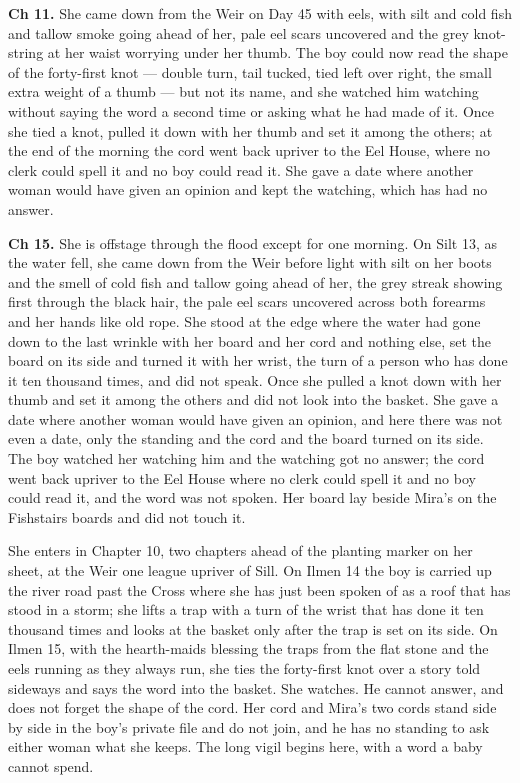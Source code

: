 \documentclass{design/chronicle}
\begin{document}
{\textbf{Ch 11.} She came down from the Weir on Day 45 with eels, with silt and cold fish and tallow smoke going ahead of her, pale eel scars uncovered and the grey knot-string at her waist worrying under her thumb. The boy could now read the shape of the forty-first knot --- double turn, tail tucked, tied left over right, the small extra weight of a thumb --- but not its name, and she watched him watching without saying the word a second time or asking what he had made of it. Once she tied a knot, pulled it down with her thumb and set it among the others; at the end of the morning the cord went back upriver to the Eel House, where no clerk could spell it and no boy could read it. She gave a date where another woman would have given an opinion and kept the watching, which has had no answer.

\textbf{Ch 15.} She is offstage through the flood except for one morning. On Silt 13, as the water fell, she came down from the Weir before light with silt on her boots and the smell of cold fish and tallow going ahead of her, the grey streak showing first through the black hair, the pale eel scars uncovered across both forearms and her hands like old rope. She stood at the edge where the water had gone down to the last wrinkle with her board and her cord and nothing else, set the board on its side and turned it with her wrist, the turn of a person who has done it ten thousand times, and did not speak. Once she pulled a knot down with her thumb and set it among the others and did not look into the basket. She gave a date where another woman would have given an opinion, and here there was not even a date, only the standing and the cord and the board turned on its side. The boy watched her watching him and the watching got no answer; the cord went back upriver to the Eel House where no clerk could spell it and no boy could read it, and the word was not spoken. Her board lay beside Mira’s on the Fishstairs boards and did not touch it.

She enters in Chapter 10, two chapters ahead of the planting marker on her sheet, at the Weir one league upriver of Sill. On Ilmen 14 the boy is carried up the river road past the Cross where she has just been spoken of as a roof that has stood in a storm; she lifts a trap with a turn of the wrist that has done it ten thousand times and looks at the basket only after the trap is set on its side. On Ilmen 15, with the hearth-maids blessing the traps from the flat stone and the eels running as they always run, she ties the forty-first knot over a story told sideways and says the word into the basket. She watches. He cannot answer, and does not forget the shape of the cord. Her cord and Mira’s two cords stand side by side in the boy’s private file and do not join, and he has no standing to ask either woman what she keeps. The long vigil begins here, with a word a baby cannot spend.

}
\end{document}

